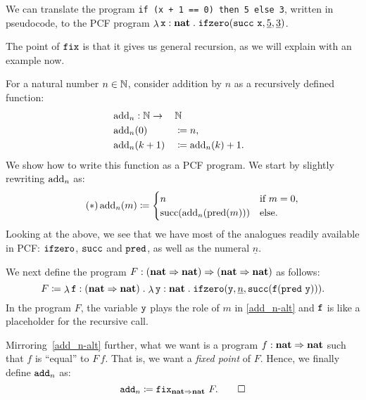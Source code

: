 \begin{example}\label{exam:ifzero}
  We can translate the program \verb|if (x + 1 == 0) then 5 else 3|, written in
  pseudocode, to the PCF program
  \(\lambdadot{\var x : \pcfnat}{\pcfifz(\pcfsuc \, \var x, \numeral 5, \numeral 3)}\).
\end{example}



The point of \(\pcffix\) is that it gives us general recursion, as we will
explain with an example now.

\begin{example}\label{exam:addition-by-n}
  For a natural number \(n \in \Nat\), consider addition by \(n\) as a
  recursively defined function:
  \begin{alignat*}{3}
    &\add_n : \Nat \to && \Nat && \\
    &\add_n(0) &&\coloneqq n, && \\
    &\add_n(k+1) &&\coloneqq \add_n(k) + 1. &&
  \end{alignat*}
  We show how to write this function as a PCF program. We start by slightly
  rewriting \(\add_n\) as:
  \begin{equation*}\label{add_n-alt}\tag{\(\ast\)}
    \add_n(m) \coloneqq
    \begin{cases}
      n &\text{if } m = 0, \\
      \suc\pa*{\add_n(\pred(m))} &\text{else}.
    \end{cases}
  \end{equation*}
  Looking at the above, we see that we have most of the analogues readily
  available in PCF: \(\pcfifz\), \(\pcfsuc\) and \(\pcfpred\), as well as the
  numeral \(\underline n\).

  We next define the program
  \(F : \pa*{\pcfnat \pcffun \pcfnat} \pcffun \pa*{\pcfnat \pcffun \pcfnat}\) as
  follows:
  \[
    F \coloneqq \lambdadot{\var f : \pa{\pcfnat \pcffun
        \pcfnat}}{\lambdadot{\var y : \pcfnat}%
      {\pcfifz\pa*{\var y,\numeral{n},%
          \pcfsuc\pa*{\var f\pa*{\pcfpred \, \var y }}}}}.
  \]
  In the program \(F\), the variable \(\var y\) plays the role of \(m\) in
  \eqref{add_n-alt} and \(\var f\) is like a placeholder for the recursive call.

  Mirroring~\eqref{add_n-alt} further, what we want is a program
  \(f : \pcfnat \pcffun \pcfnat\) such that \(f\) is ``equal'' to \(F\,f\). That
  is, we want a \emph{fixed point} of \(F\).
  Hence, we finally define \(\pcfadd_n\) as:
  \[
    \pcfadd_n \coloneqq \pcffix_{\pcfnat \pcffun \pcfnat} \, F. \qedhere
  \]
\end{example}

